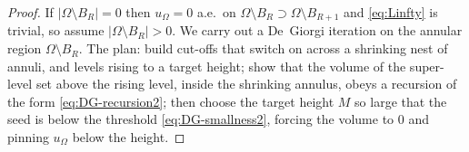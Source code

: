 \documentclass[11pt]{amsart}
\theoremstyle{definition}
\newcommand{\Om}{\Omega}
\newcommand{\abs}[1]{\left|#1\right|}
\begin{document}
\begin{proof}
If $\abs{\Om\setminus B_R}=0$ then $u_\Om=0$ a.e.\ on
$\Om\setminus B_R\supset\Om\setminus B_{R+1}$ and \eqref{eq:Linfty} is
trivial, so assume $\abs{\Om\setminus B_R}>0$.
We carry out a De~Giorgi iteration on the annular region
$\Om\setminus B_R$. The plan: build cut-offs that switch on across a
shrinking nest of annuli, and levels rising to a target height; show
that the volume of the super-level set above the rising level, inside the
shrinking annulus, obeys a recursion of the form
\eqref{eq:DG-recursion2}; then choose the target height $M$ so large that
the seed is below the threshold \eqref{eq:DG-smallness2}, forcing the
volume to $0$ and pinning $u_\Om$ below the height.


\end{proof}
\end{document}
